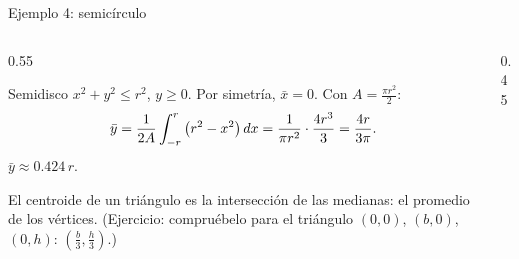 \documentclass[10pt,aspectratio=169]{beamer}
\begin{document}
\begin{frame}{Ejemplo 4: semicírculo}
  \begin{columns}
    \begin{column}{0.55\textwidth}
      \begin{ejemplo}
        Semidisco $x^2+y^2\le r^2$, $y\ge0$. Por simetría, $\bar x=0$. Con $A=\frac{\pi r^2}2$:
        \[ \bar y=\frac{1}{2A}\int_{-r}^r\big(r^2-x^2\big)\,dx=\frac{1}{\pi r^2}\cdot\frac{4r^3}{3}=\frac{4r}{3\pi}. \]
        $\bar y\approx0.424\,r$.
      \end{ejemplo}
      \begin{ejemplo}[5: triángulo]
        El centroide de un triángulo es la intersección de las medianas: el promedio de los vértices.
        (Ejercicio: compruébelo para el triángulo $(0,0)$, $(b,0)$, $(0,h)$: $\left(\frac b3,\frac h3\right)$.)
      \end{ejemplo}
    \end{column}
    \begin{column}{0.45\textwidth}
      \centering
    \end{column}
  \end{columns}
\end{frame}
\end{document}
